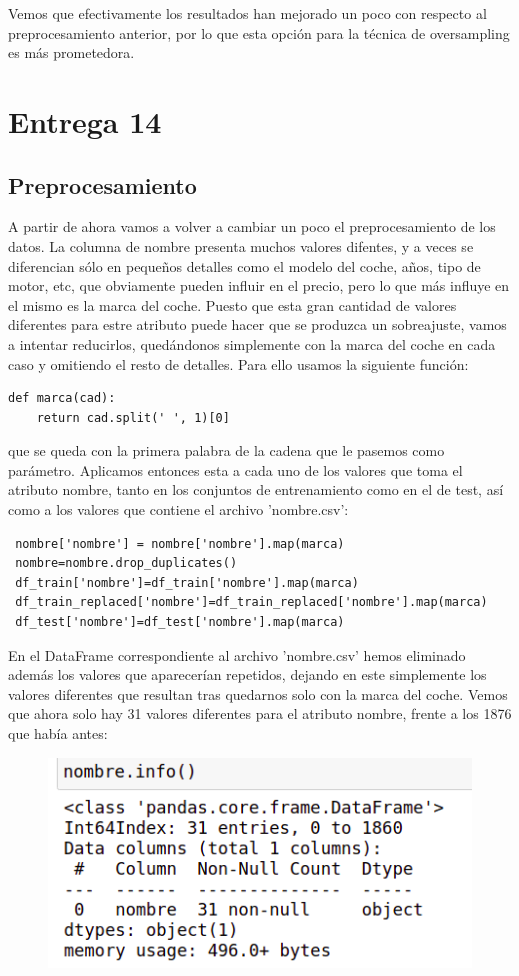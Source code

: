 \documentclass[a4paper,11pt]{article}
\begin{document}
Vemos que efectivamente los resultados han mejorado un poco con respecto al preprocesamiento anterior, por lo que esta opción para la técnica de oversampling es más prometedora. 

\section{Entrega 14}
\subsection{Preprocesamiento}
A partir de ahora vamos a volver a cambiar un poco el preprocesamiento de los datos. La columna de nombre presenta muchos valores difentes, y a veces se diferencian sólo en pequeños detalles como el modelo del coche, años, tipo de motor, etc, que obviamente pueden influir en el precio, pero lo que más influye en el mismo es la marca del coche. Puesto que esta gran cantidad de valores diferentes para estre atributo puede hacer que se produzca un sobreajuste, vamos a intentar reducirlos, quedándonos simplemente con la marca del coche en cada caso y omitiendo el resto de detalles. Para ello usamos la siguiente función:

\begin{verbatim}
def marca(cad):
	return cad.split(' ', 1)[0]
\end{verbatim}
 
 que se queda con la primera palabra de la cadena que le pasemos como parámetro. Aplicamos entonces esta a cada uno de los valores que toma el atributo nombre, tanto en los conjuntos de entrenamiento como en el de test, así como a los valores que contiene el archivo 'nombre.csv':
 \begin{verbatim}
 nombre['nombre'] = nombre['nombre'].map(marca)
 nombre=nombre.drop_duplicates()
 df_train['nombre']=df_train['nombre'].map(marca)
 df_train_replaced['nombre']=df_train_replaced['nombre'].map(marca)
 df_test['nombre']=df_test['nombre'].map(marca)
 \end{verbatim}
  En el DataFrame correspondiente al archivo 'nombre.csv' hemos eliminado además los valores que aparecerían repetidos, dejando en este simplemente los valores diferentes que resultan tras quedarnos solo con la marca del coche. Vemos que ahora solo hay 31 valores diferentes para el atributo nombre, frente a los 1876 que había antes:
  
  \begin{figure}[H]
  	\centering
  	\includegraphics[width=0.5\linewidth]{img/nombre}
  	\caption{}
  	\label{fig:nombre}
  \end{figure}
  
\end{document}
